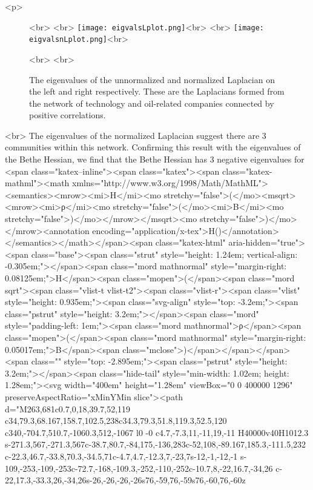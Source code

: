<p>\begin{figure}[h]<br>
\centering<br>
\texttt{[image: eigvalsLplot.png]}<br>
\hfill<br>
\texttt{[image: eigvalsnLplot.png]}<br>
\caption{The eigenvalues of the unnormalized and normalized Laplacian on the left and right respectively. These are the Laplacians formed from the network of technology and oil-related companies connected by positive correlations. }<br>
\label{eigval plots}<br>
\end{figure}<br>
The eigenvalues of the normalized Laplacian suggest there are 3 communities within this network. Confirming this result with the eigenvalues of the Bethe Hessian, we find that the Bethe Hessian has 3 negative eigenvalues for <span class="katex--inline"><span class="katex"><span class="katex-mathml"><math xmlns="http://www.w3.org/1998/Math/MathML"><semantics><mrow><mi>H</mi><mo stretchy="false">(</mo><msqrt><mrow><mi>ρ</mi><mo stretchy="false">(</mo><mi>B</mi><mo stretchy="false">)</mo></mrow></msqrt><mo stretchy="false">)</mo></mrow><annotation encoding="application/x-tex">H()</annotation></semantics></math></span><span class="katex-html" aria-hidden="true"><span class="base"><span class="strut" style="height: 1.24em; vertical-align: -0.305em;"></span><span class="mord mathnormal" style="margin-right: 0.08125em;">H</span><span class="mopen">(</span><span class="mord sqrt"><span class="vlist-t vlist-t2"><span class="vlist-r"><span class="vlist" style="height: 0.935em;"><span class="svg-align" style="top: -3.2em;"><span class="pstrut" style="height: 3.2em;"></span><span class="mord" style="padding-left: 1em;"><span class="mord mathnormal">ρ</span><span class="mopen">(</span><span class="mord mathnormal" style="margin-right: 0.05017em;">B</span><span class="mclose">)</span></span></span><span class="" style="top: -2.895em;"><span class="pstrut" style="height: 3.2em;"></span><span class="hide-tail" style="min-width: 1.02em; height: 1.28em;"><svg width="400em" height="1.28em" viewBox="0 0 400000 1296" preserveAspectRatio="xMinYMin slice"><path d="M263,681c0.7,0,18,39.7,52,119
c34,79.3,68.167,158.7,102.5,238c34.3,79.3,51.8,119.3,52.5,120
c340,-704.7,510.7,-1060.3,512,-1067
l0 -0
c4.7,-7.3,11,-11,19,-11
H40000v40H1012.3
s-271.3,567,-271.3,567c-38.7,80.7,-84,175,-136,283c-52,108,-89.167,185.3,-111.5,232
c-22.3,46.7,-33.8,70.3,-34.5,71c-4.7,4.7,-12.3,7,-23,7s-12,-1,-12,-1
s-109,-253,-109,-253c-72.7,-168,-109.3,-252,-110,-252c-10.7,8,-22,16.7,-34,26
c-22,17.3,-33.3,26,-34,26s-26,-26,-26,-26s76,-59,76,-59s76,-60,76,-60z
